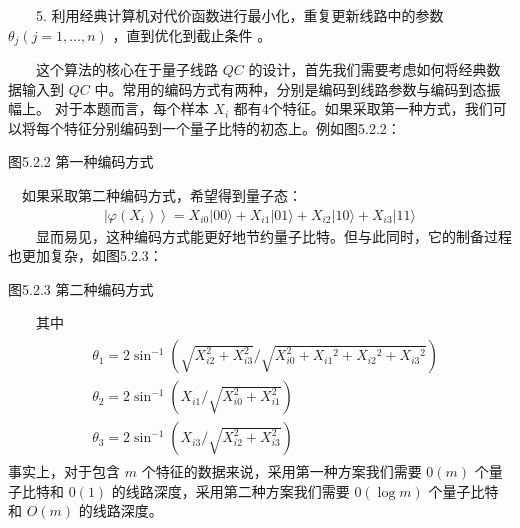 \documentclass[a4paper,11pt,english]{sphinxmanual}
\begin{document}
\sphinxAtStartPar
  5. 利用经典计算机对代价函数进行最小化，重复更新线路中的参数  \(\theta_{j}(j=1, \ldots , n)\) ，直到优化到截止条件 。

\sphinxAtStartPar
  这个算法的核心在于量子线路  \(Q C\) 的设计，首先我们需要考虑如何将经典数据输入到 \(Q C\) 中。常用的编码方式有两种，分别是编码到线路参数与编码到态振幅上。 对于本题而言，每个样本 \(X_{i}\) 都有4个特征。如果采取第一种方式，我们可以将每个特征分别编码到一个量子比特的初态上。例如图5.2.2：


\begin{center}图5.2.2 第一种编码方式
\end{center}
\sphinxAtStartPar
 如果采取第二种编码方式，希望得到量子态：
\begin{equation*}
\begin{split}\left|\varphi\left(X_{i}\right)\right\rangle=X_{i 0}|00\rangle+X_{i 1}|01\rangle+X_{i 2}|10\rangle+X_{i 3}|11\rangle\end{split}
\end{equation*}
\sphinxAtStartPar
  显而易见，这种编码方式能更好地节约量子比特。但与此同时，它的制备过程也更加复杂，如图5.2.3：


\begin{center}图5.2.3 第二种编码方式
\end{center}
\sphinxAtStartPar
  其中
\begin{equation*}
\begin{split}\begin{aligned} &\theta_{1}=2 \sin ^{-1}\left(\sqrt{X_{i 2}^{2}+X_{i 3}^{2}} / \sqrt{X_{i 0}^{2}+X_{i 1}{ }^{2}+X_{i 2}{ }^{2}+X_{i 3}{ }^{2}}\right) \\ &\theta_{2}=2 \sin ^{-1}\left(X_{i 1} / \sqrt{X_{i 0}^{2}+X_{i 1}^{2}}\right) \\ &\theta_{3}=2 \sin ^{-1}\left(X_{i 3} / \sqrt{X_{i 2}^{2}+X_{i 3}^{2}}\right) \end{aligned}\end{split}
\end{equation*}
\sphinxAtStartPar
事实上，对于包含  \(m\) 个特征的数据来说，采用第一种方案我们需要 \(0(m)\) 个量子比特和 \(0(1)\) 的线路深度，采用第二种方案我们需要 \(0(\log m)\) 个量子比特和  \(O(m)\) 的线路深度。
\end{document}
